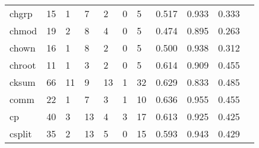 \begin{longtable}{lp{1.10cm}p{1.10cm}p{1.10cm}p{1.10cm}p{1.10cm}p{1.10cm}p{1.10cm}p{1.10cm}p{1.10cm}p{1.10cm}}
chgrp     &                     15 &                                  1 &                                 7 &                                2 &                                 0 &                               5 &                          0.517 &                                 0.933 &                               0.333 \\
chmod     &                     19 &                                  2 &                                 8 &                                4 &                                 0 &                               5 &                          0.474 &                                 0.895 &                               0.263 \\
chown     &                     16 &                                  1 &                                 8 &                                2 &                                 0 &                               5 &                          0.500 &                                 0.938 &                               0.312 \\
chroot    &                     11 &                                  1 &                                 3 &                                2 &                                 0 &                               5 &                          0.614 &                                 0.909 &                               0.455 \\
cksum     &                     66 &                                 11 &                                 9 &                               13 &                                 1 &                              32 &                          0.629 &                                 0.833 &                               0.485 \\
comm      &                     22 &                                  1 &                                 7 &                                3 &                                 1 &                              10 &                          0.636 &                                 0.955 &                               0.455 \\
cp        &                     40 &                                  3 &                                13 &                                4 &                                 3 &                              17 &                          0.613 &                                 0.925 &                               0.425 \\
csplit    &                     35 &                                  2 &                                13 &                                5 &                                 0 &                              15 &                          0.593 &                                 0.943 &                               0.429 \\

\end{longtable}
